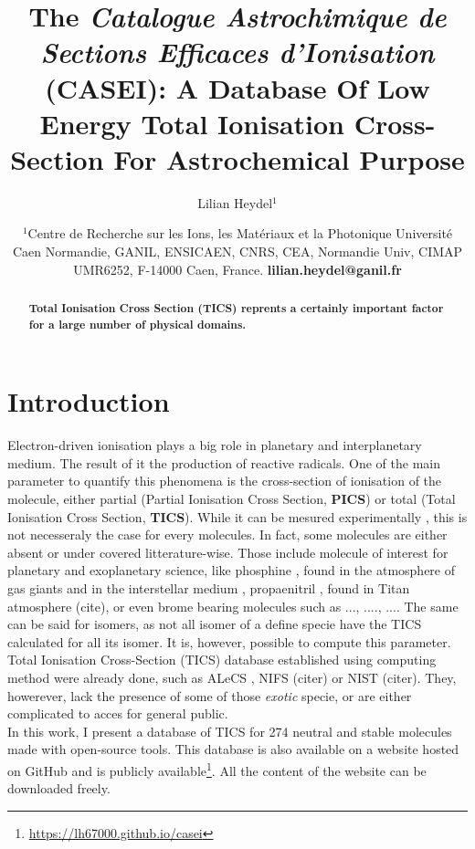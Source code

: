 \documentclass[twocolumn, a4paper, twoside,10pt]{scrartcl}
\title{\Large \sffamily \bfseries The \textit{Catalogue Astrochimique de Sections Efficaces d'Ionisation} (CASEI): A Database Of Low Energy Total Ionisation Cross-Section For Astrochemical Purpose}
\author{\normalsize Lilian Heydel$^{1}$}
\date{\footnotesize $^1$Centre de Recherche sur les Ions, les Matériaux et la Photonique Université Caen Normandie, GANIL, ENSICAEN, CNRS, CEA, Normandie
Univ, CIMAP UMR6252, F-14000 Caen, France. \textbf{lilian.heydel@ganil.fr}}
\begin{document}
\pagestyle{fancy}
\maketitle
\begin{abstract}
\bfseries
Total Ionisation Cross Section (TICS) reprents a certainly important factor for a large number of physical domains.
\end{abstract}
\section{Introduction}
Electron-driven ionisation plays a big role in planetary and interplanetary medium. The result of it the production of reactive radicals. One of the main parameter to quantify this phenomena is the cross-section of ionisation of the molecule, either partial (Partial Ionisation Cross Section, \textbf{PICS}) or total (Total Ionisation Cross Section, \textbf{TICS}). While it can be mesured experimentally \citep[and reference therein]{rappTotalCrossSections1965,jiaoElectronImpactIonization2007}, this is not necesseraly the case for every molecules. In fact, some molecules are either absent or under covered litterature-wise. Those include molecule of interest for planetary and exoplanetary science, like phosphine , found in the atmosphere of gas giants and in the interstellar medium \citep{burgasserObservationUndepletedPhosphine2025,larsonMiddleinfraredSpectrumSaturn1980,ridgway8001200InverseCentimeter1976}, propaenitril , found in Titan atmosphere (cite), or even brome bearing molecules such as ..., ...., .... The same can be said for isomers, as not all isomer of a define specie have the TICS calculated for all its isomer. It is, however, possible to compute this parameter. Total Ionisation Cross-Section (TICS) database established using computing method were already done, such as ALeCS \citep{gachesAstrochemistryLowenergyElectron2024}, NIFS (citer) or NIST (citer). They, howerever, lack the presence of some of those \textit{exotic} specie, or are either complicated to acces for general public.\\
In this work, I present a database of TICS for 274 neutral and stable molecules made with open-source tools. 
This database is also available on a website hosted on GitHub and is publicly available\footnote{\url{https://lh67000.github.io/casei}}. All the content of the website can be downloaded freely.
\end{document}
